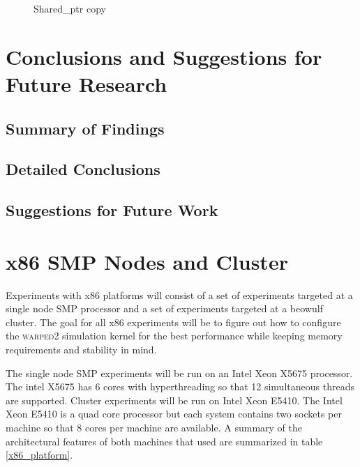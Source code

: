 \documentclass[11pt]{book}
\begin{document}
\begin{figure}
\begin{minipage}{.5\textwidth}
\begin{center}
      Shared\_ptr copy \\
    \end{center}
  \end{minipage}
\end{figure}

\chapter[Conclusions \& Future Research]{Conclusions and Suggestions for Future Research}
\label{conclude}

\section{Summary of Findings}

\section{Detailed Conclusions}

\section{Suggestions for Future Work}


\appendix
\chapter{x86 SMP Nodes and Cluster}\label{x86_nodes_and_clusters}

Experiments with x86 platforms will consist of a set of experiments targeted at a single node
SMP processor and a set of experiments targeted at a beowulf cluster. The goal for all x86
experiments will be to figure out how to configure the \textsc{warped2} simulation kernel for
the best performance while keeping memory requirements and stability in mind.

The single node SMP experiments will be run on an Intel Xeon X5675 processor. The intel X5675
has 6 cores with hyperthreading so that 12 simultaneous threads are supported.
Cluster experiments will be run on Intel Xeon E5410. The Intel Xeon E5410 is a quad core processor
but each system contains two sockets per machine so that 8 cores per machine are available.
A summary of the architectural features of both machines that used are summarized in table
\ref{x86_platform}.
\end{document}
